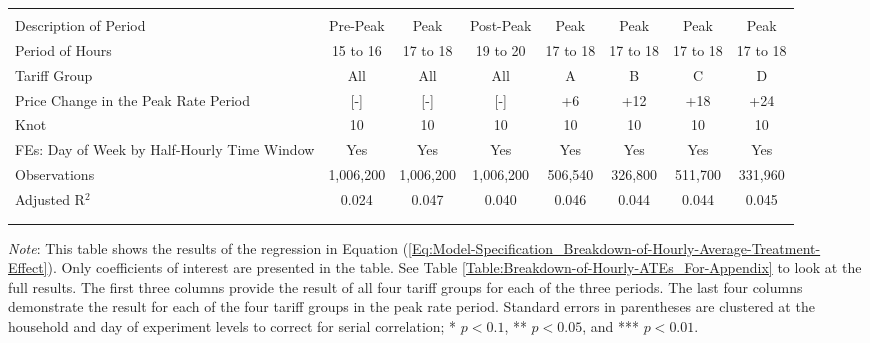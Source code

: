 \begin{table}[t!]
\begin{adjustbox}{scale = 0.83}
\begin{threeparttable}
\begin{tabular}{@{\extracolsep{20pt}}lccccccc}
                    & & & & & & & \\
                    \hline
                    \\[-2.0ex]
                    Description of Period & Pre-Peak & Peak & Post-Peak & Peak & Peak & Peak & Peak \\
                    Period of Hours & 15 to 16 & 17 to 18 & 19 to 20 & 17 to 18 & 17 to 18 & 17 to 18 & 17 to 18 \\
                    Tariff Group & All & All & All & A & B & C & D \\
                    Price Change in the Peak Rate Period & [-] & [-] & [-] & +6 & +12 & +18 & +24 \\
                    Knot & 10 & 10 & 10 & 10 & 10 & 10 & 10 \\
                    FEs: Day of Week by Half-Hourly Time Window & Yes & Yes & Yes & Yes & Yes & Yes & Yes \\
                    Observations & 1,006,200 & 1,006,200 & 1,006,200 & 506,540 & 326,800 & 511,700 & 331,960 \\
                    Adjusted R$^{2}$ & 0.024 & 0.047 & 0.040 & 0.046 & 0.044 & 0.044 & 0.045 \\
                    \\[-2.0ex]
                    \hline \hline
                    \\[-4.5ex]
                \end{tabular}
                \begin{tablenotes}[flushleft]
                    \footnotesize
                    \item \textit{Note}: This table shows the results of the regression in Equation (\ref{Eq:Model-Specification_Breakdown-of-Hourly-Average-Treatment-Effect}). Only coefficients of interest are presented in the table. See Table \ref{Table:Breakdown-of-Hourly-ATEs_For-Appendix} to look at the full results. The first three columns provide the result of all four tariff groups for each of the three periods. The last four columns demonstrate the result for each of the four tariff groups in the peak rate period. Standard errors in parentheses are clustered at the household and day of experiment levels to correct for serial correlation; * $p < 0.1$, ** $p < 0.05$, and *** $p < 0.01$.
                \end{tablenotes}
            \end{threeparttable}
        \end{adjustbox}
    \end{table}

